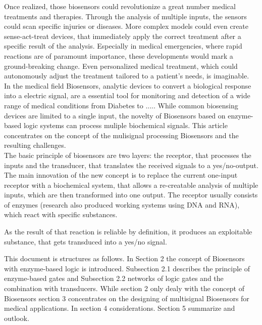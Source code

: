 \documentclass[runningheads]{llncs}
\begin{document}
	Once realized, those biosensors could revolutionize a great number medical treatments and therapies. Through the analysis of multiple inputs, the sensors could scan specific injuries or diseases. More complex models could even create sense-act-treat devices, that immediately apply the correct treatment after a specific result of the analysis. Especially in medical emergencies, where rapid reactions are of paramount importance, these developments would mark a ground-breaking change. Even personalized medical treatment, which could autonomously adjust the treatment tailored to a patient’s needs, is imaginable.\\
	
	
	In the medical field Biosensors, analytic devices to convert a biological response into a electric signal, are a essential tool for monitoring and detection of a wide range of medical conditions from Diabetes to .....
	While common biosensing devices are limited to a single input, the novelty of Biosensors based on enzyme-based logic systems can process muliple biochemical signals. This article concentrates on the concept of the mulisignal processing Biosensors and the resulting challenges.\\
	
	The basic principle of biosensors are two layers: the receptor, that processes the inputs and the transducer, that translates the received signals to a yes/no-output. The main innovation of the new concept is to replace the current one-input receptor with a biochemical system, that allows a re-creatable analysis of multiple inputs, which are then transformed into one output. The receptor usually consists of enzymes (research also produced working systems using DNA and RNA), which react with specific substances. 
	 
	 As the result of that reaction is reliable by definition, it produces an exploitable substance, that gets transduced into a yes/no signal.
	

	This document is structures as follows. In Section 2 the concept of Biosensors with enzyme-based logic is introduced. Subsection 2.1 describes the principle of enzyme-based gates and Subsection 2.2 networks of logic gates and the combination with transducers. While section 2 only dealy with the concept of Biosensors section 3 concentrates on the designing of multisignal Biosensors for medical applications.
	In section 4 considerations. Section 5 summarize and outlook. 
	
	
	
	
	
\end{document}
